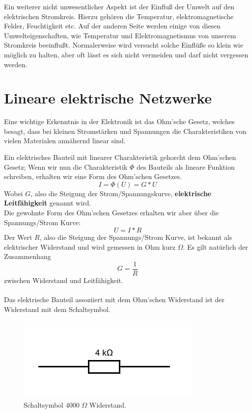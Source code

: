 \documentclass[11pt,a4paper,leqno]{report}
\numberwithin{equation}{chapter}
\begin{document}
Ein weiterer nicht unwesentlicher Aspekt ist der Einflu\ss{} der Umwelt auf den elektrischen Stromkreis. Hierzu geh\"oren die Temperatur, elektromagnetische Felder, Feuchtigkeit etc.
Auf der anderen Seite werden einige von diesen Umwelteigenschaften, wie Temperatur und Elektromagnetismus von unserem Stromkreis beeinflu\ss{}t. Normalerweise wird versucht solche Einfl\"u\ss{}e so klein wie m\"oglich zu halten, aber oft l\"asst es sich nicht vermeiden und darf nicht vergessen werden.
\section{Lineare elektrische Netzwerke}
Eine wichtige Erkenntnis in der Elektronik ist das Ohm'sche Gesetz, welches besagt, dass bei kleinen Stromst\"arken und Spannungen die Charakteristiken von vielen Materialen ann\"ahernd linear sind.
\begin{figure}[H]
\end{figure}
\noindent
Ein elektrisches Bauteil mit linearer Charakteristik gehorcht dem Ohm'schen Gesetz; Wenn wir nun die Charakteristik $\Phi$ des Bauteils als lineare Funktion schreiben, erhalten wir eine Form des Ohm'schen Gesetzes.
\begin{equation}
I = \Phi(U) = G * U
\end{equation}
Wobei $G$, also die Steigung der Strom/Spannungskurve, \textbf{elektrische Leitf\"ahigkeit} genannt wird.\\
Die gewohnte Form des Ohm'schen Gesetzes erhalten wir aber \"uber die  Spannungs/Strom Kurve:
\begin{equation}
U = I * R
\end{equation}
\noindent
Der Wert $R$, also die Steigung der Spannungs/Strom Kurve, ist bekannt als elektrischer Widerstand und wird gemessen in Ohm kurz $\Omega$.
Es gilt nat\"urlich der Zusammenhang
\begin{equation}
G = \frac{1}{R}
\end{equation}
zwischen Widerstand und Leitf\"ahigkeit.
\\
\\
Das elektrische Bauteil assoziiert mit dem Ohm'schen Widerstand ist der Widerstand mit dem Schaltsymbol.
\begin{figure}[H]
	\begin{center}
		\includegraphics[scale=1]{Bilder/widder.pdf}
		\caption{Schaltsymbol 4000 $\Omega$ Widerstand.}
	\end{center}
\end{figure}
\end{document}
